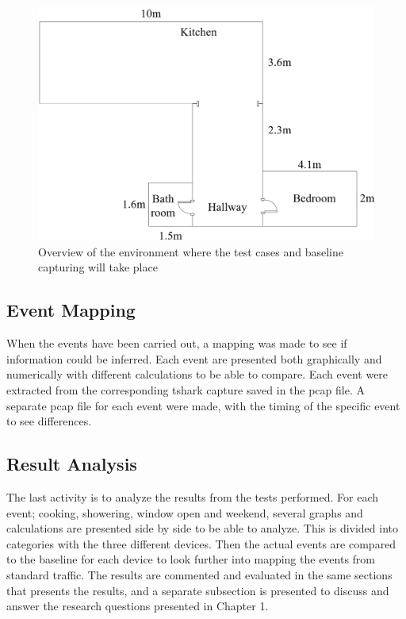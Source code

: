 \begin{figure}[H]
    \centering
    \includegraphics[width=1\textwidth]{figures/Apartment.png}
    \caption{Overview of the environment where the test cases and baseline capturing will take place}
    \label{fig:Apartment}
\end{figure}
    

\subsection{Event Mapping}
When the events have been carried out, a mapping was made to see if information could be inferred. Each event are presented both graphically and numerically with different calculations to be able to compare. Each event were extracted from the corresponding tshark capture saved in the pcap file. A separate pcap file for each event were made, with the timing of the specific event to see differences. 

\subsection{Result Analysis}
The last activity is to analyze the results from the tests performed. For each event; cooking, showering, window open and weekend, several graphs and calculations are presented side by side to be able to analyze. This is divided into categories with the three different devices. Then the actual events are compared to the baseline for each device to look further into mapping the events from standard traffic. The results are commented and evaluated in the same sections that presents the results, and a separate subsection is presented to discuss and answer the research questions presented in Chapter 1. 